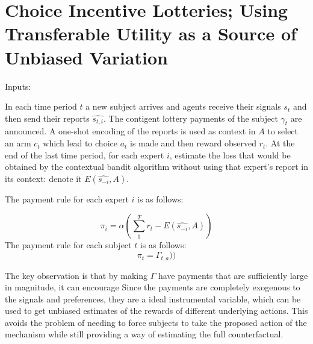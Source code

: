
\section{Choice Incentive Lotteries;  Using Transferable Utility as a Source of Unbiased Variation}


\begin{mech}
Inputs:

In each time period $t$ a new subject arrives and agents receive their signals $s_t$ and then send their reports $\hat{s_{t,i}}$. The contigent lottery payments of the subject $\gamma_t$ are announced. A one-shot encoding of the reports is used as context in $A$ to select an arm $c_t$ which lead to choice $a_t$ is made and then reward observed $r_t$.
At the end of the last time period, for each expert $i$, estimate the loss that would be obtained by the contextual bandit algorithm without using that expert's report in its context: denote it $E(\hat{s_{-i}},A)$.

The payment rule for each expert $i$ is as follows:

\[
    \pi_i =  \alpha (\sum_1^T r_t -  E(\hat{s_{-i}},A))
\]
The payment rule for each subject $t$ is as follows:
\[
    \pi_t =  \Gamma_{t,a}))
\]


\end{mech}

The key observation is that by making $\Gamma$ have payments that are sufficiently large in magnitude, it can encourage 
Since the payments are completely exogenous to the signals and preferences, they are a ideal instrumental variable, which can be used to get unbiased estimates of the rewards of different underlying actions.
This avoids the problem of needing to force subjects to take the proposed action of the mechanism while still providing a way of estimating the full counterfactual.






